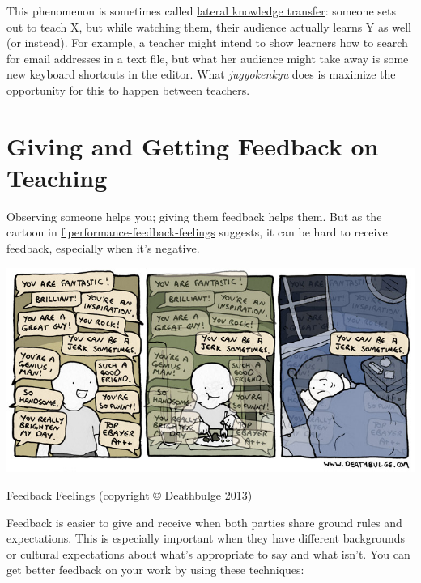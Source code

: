 This phenomenon is sometimes called \protect\hyperlink{g:lateral-knowledge-transfer}{lateral knowledge
transfer}: someone sets out to teach X,
but while watching them, their audience actually learns Y as well (or
instead). For example, a teacher might intend to show learners how to
search for email addresses in a text file, but what her audience might
take away is some new keyboard shortcuts in the editor. What
\emph{jugyokenkyu} does is maximize the opportunity for this to happen
between teachers.

\section{Giving and Getting Feedback on Teaching}\label{s:performance-feedback}

Observing someone helps you; giving them feedback helps them. But as the
cartoon in \protect\hyperlink{FIGURE}{f:performance-feedback-feelings} suggests, it can
be hard to receive feedback, especially when it's negative.

\includegraphics{../../files/deathbulge-jerk.jpg}

Feedback Feelings (copyright © Deathbulge 2013)

Feedback is easier to give and receive when both parties share ground
rules and expectations. This is especially important when they have
different backgrounds or cultural expectations about what's appropriate
to say and what isn't. You can get better feedback on your work by using
these techniques:

